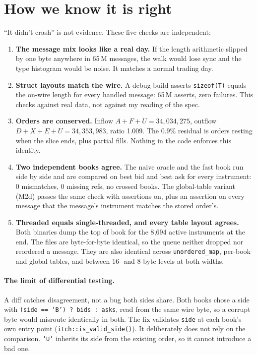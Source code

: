 \documentclass[10pt,a4paper]{article}
\newcommand{\code}[1]{\texttt{#1}}
\begin{document}
\section{How we know it is right}
``It didn't crash'' is not evidence. These five checks are independent:
\begin{enumerate}
  \item \textbf{The message mix looks like a real day.} If the length arithmetic slipped by one byte anywhere in 65\,M messages,
        the walk would lose sync and the type histogram would be noise. It matches a normal trading day.
  \item \textbf{Struct layouts match the wire.} A debug build asserts \code{sizeof(T)} equals the on-wire length for every handled
        message: 65\,M asserts, zero failures. This checks against real data, not against my reading of the spec.
  \item \textbf{Orders are conserved.} Inflow $A+F+U = 34{,}034{,}275$, outflow $D+X+E+U = 34{,}353{,}983$, ratio 1.009.
        The 0.9\% residual is orders resting when the slice ends, plus partial fills. Nothing in the code enforces this identity.
  \item \textbf{Two independent books agree.} The naive oracle and the fast book run side by side and are compared on
        best bid and best ask for every instrument: 0 mismatches, 0 missing refs, no crossed books.
        The global-table variant (M2d) passes the same check with assertions on, plus an assertion on every message that the message's instrument matches the stored order's.
  \item \textbf{Threaded equals single-threaded, and every table layout agrees.} Both binaries dump the top of book for the 8{,}694 active instruments at the end.
        The files are byte-for-byte identical, so the queue neither dropped nor reordered a message. They are also identical across
        \code{unordered\_map}, per-book and global tables, and between 16- and 8-byte levels at both widths.
\end{enumerate}

\paragraph{The limit of differential testing.} A diff catches disagreement, not a bug both sides share. Both books chose a side with
\code{(side == 'B') ? bids : asks}, read from the same wire byte, so a corrupt byte would misroute identically in both.
The fix validates \code{side} at each book's own entry point (\code{itch::is\_valid\_side()}). It deliberately does not rely on the comparison.
\code{'U'} inherits its side from the existing order, so it cannot introduce a bad one.
\end{document}
